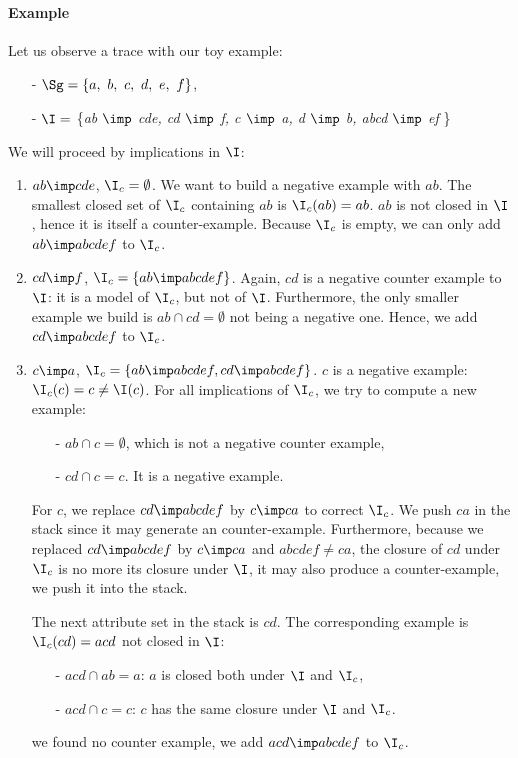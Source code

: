 \paragraph{Example} Let us observe a trace with our toy example:
\begin{itemize}
	\item[-] $\Sg = \{a, \ b, \ c, \ d, \ e, \ f \}$,
	\item[-] $\I =$ \{\textit{ab $\imp$ cde, cd $\imp$ f, c $\imp$ a, d $\imp$ b, abcd $\imp$ ef} \} 
\end{itemize}
\noindent We will proceed by implications in $\I$:
\begin{enumerate}
	\item $ab \imp cde$, $\I_c = \emptyset$. We want to build a negative example with $ab$. The smallest closed set of $\I_c$ containing $ab$ is
	$\I_c(ab) = ab$. $ab$ is not closed in $\I$, hence it is itself a counter-example. Because $\I_c$ is empty, we can only add $ab \imp abcdef$ to $\I_c$.
	
	\item $cd \imp f$, $\I_c = \{ ab \imp abcdef \}$. Again, $cd$ is a negative
	counter example to $\I$: it is a model of $\I_c$, but not of $\I$. Furthermore, the only smaller example we build is $ab \cap cd = \emptyset$ 
	not being a negative one. Hence, we add $cd \imp abcdef$ to $\I_c$.
	
	\item $c \imp a$, $\I_c = \{ ab \imp abcdef, cd \imp abcdef \}$. $c$ is a
	negative example: $\I_c(c) = c \neq \I(c)$. For all implications of $\I_c$,
	we try to compute a new example:
	\begin{itemize}
		\item[-] $ab \cap c = \emptyset$, which is not a negative counter example,
		\item[-] $cd \cap c = c$. It is a negative example.
	\end{itemize}
	For $c$, we replace $cd \imp abcdef$ by $c \imp ca$ to correct $\I_c$. We push $ca$ in the stack since it may generate an counter-example. Furthermore, because we replaced $cd \imp abcdef$ by $c \imp ca$ and $abcdef \neq ca$, the closure of $cd$ under $\I_c$ is no more its closure under $\I$, it may also produce a counter-example, we push it into the stack.
	
	The next attribute set in the stack is $cd$. The corresponding example is
	$\I_c(cd) = acd$ not closed in $\I$:
	\begin{itemize}
		\item[-]$acd \cap ab = a$: $a$ is closed both under $\I$ and $\I_c$,
		\item[-]$acd \cap c = c$: $c$ has the same closure under $\I$ and $\I_c$.
	\end{itemize}
	we found no counter example, we add $acd \imp abcdef$ to $\I_c$.
	

\end{enumerate}
